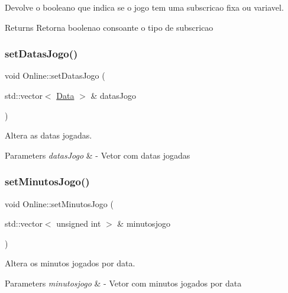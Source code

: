 Devolve o booleano que indica se o jogo tem uma subscricao fixa ou variavel. 

\begin{DoxyReturn}{Returns}
Retorna boolenao consoante o tipo de subscricao 
\end{DoxyReturn}
\mbox{\label{class_online_a3c0b8d3393271eabfa702629c979fb93}} 
\subsubsection{\texorpdfstring{set\+Datas\+Jogo()}{setDatasJogo()}}
{\footnotesize\ttfamily void Online\+::set\+Datas\+Jogo (\begin{DoxyParamCaption}\item[{std\+::vector$<$ \mbox{\hyperlink{class_data}{Data}} $>$ \&}]{datas\+Jogo }\end{DoxyParamCaption})}



Altera as datas jogadas. 


\begin{DoxyParams}{Parameters}
{\em datas\+Jogo} & -\/ Vetor com datas jogadas \\
\hline
\end{DoxyParams}
\mbox{\label{class_online_a71cc818cd9b8020a470efc14f636a9f9}} 
\subsubsection{\texorpdfstring{set\+Minutos\+Jogo()}{setMinutosJogo()}}
{\footnotesize\ttfamily void Online\+::set\+Minutos\+Jogo (\begin{DoxyParamCaption}\item[{std\+::vector$<$ unsigned int $>$ \&}]{minutosjogo }\end{DoxyParamCaption})}



Altera os minutos jogados por data. 


\begin{DoxyParams}{Parameters}
{\em minutosjogo} & -\/ Vetor com minutos jogados por data \\
\hline
\end{DoxyParams}


